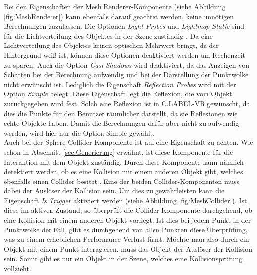 Bei den Eigenschaften der Mesh Renderer-Komponente (siehe Abbildung \ref{fig:MeshRenderer}) kann ebenfalls darauf geachtet werden, keine unnötigen Berechnungen zuzulassen. Die Optionen \textit{Light Probes} und \textit{Lightmap Static} sind für die Lichtverteilung des Objektes in der Szene zuständig \cite{bib:LightProbes}. Da eine Lichtverteilung des Objektes keinen optischen Mehrwert bringt, da der Hintergrund weiß ist, können diese Optionen deaktiviert werden um Rechenzeit zu sparen. Auch die Option \textit{Cast Shadows} wird deaktiviert, da das Anzeigen von Schatten bei der Berechnung aufwendig und bei der Darstellung der Punktwolke nicht erwünscht ist. Lediglich die Eigenschaft \textit{Reflection Probes} wird mit der Option \textit{Simple} belegt. Diese Eigenschaft legt die Reflexion, die vom Objekt zurückgegeben wird fest. Solch eine Reflexion ist in C.LABEL-VR gewünscht, da dies die Punkte für den Benutzer räumlicher darstellt, da sie Reflexionen wie echte Objekte haben. Damit die Berechnungen dafür aber nicht zu aufwendig werden, wird hier nur die Option Simple gewählt.\\

Auch bei der Sphere Collider-Komponente ist auf eine Eigenschaft zu achten. Wie schon in Abschnitt \ref{sec:Generierung} erwähnt, ist diese Komponente für die Interaktion mit dem Objekt zuständig. Durch diese Komponente kann nämlich detektiert werden, ob  es eine Kollision mit einem anderen Objekt gibt, welches ebenfalls einen Collider besitzt \cite{bib:Collider}. Eine der beiden Collider-Komponenten muss dabei der Auslöser der Kollision sein. Um dies zu gewährleisten kann die Eigenschaft \textit{Is Trigger} aktiviert werden (siehe Abbildung \ref{fig:MeshCollider}). Ist diese im aktiven Zustand, so überprüft die Collider-Komponente durchgehend, ob eine Kollision mit einem anderen Objekt vorliegt. Ist dies bei jedem Punkt in der Punktwolke der Fall, gibt es durchgehend von allen Punkten diese Überprüfung, was zu einem erheblichen Performance-Verlust führt. Möchte man also durch ein Objekt mit einem Punkt interagieren, muss das Objekt der Auslöser der Kollision sein. Somit gibt es nur ein Objekt in der Szene, welches eine Kollisionsprüfung vollzieht.\\

